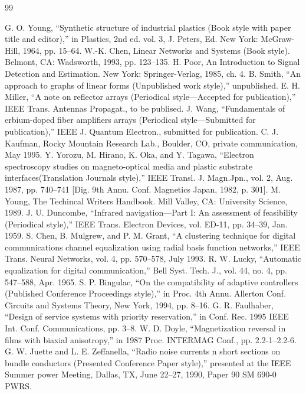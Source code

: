 \documentclass[letterpaper, 10 pt, conference]{ieeeconf}  %
\begin{document}
\begin{thebibliography}{99}

 G. O. Young, ``Synthetic structure of industrial plastics (Book style with paper title and editor),'' 	in Plastics, 2nd ed. vol. 3, J. Peters, Ed.  New York: McGraw-Hill, 1964, pp. 15--64.
 W.-K. Chen, Linear Networks and Systems (Book style).	Belmont, CA: Wadsworth, 1993, pp. 123--135.
 H. Poor, An Introduction to Signal Detection and Estimation.   New York: Springer-Verlag, 1985, ch. 4.
 B. Smith, ``An approach to graphs of linear forms (Unpublished work style),'' unpublished.
 E. H. Miller, ``A note on reflector arrays (Periodical style---Accepted for publication),'' IEEE Trans. Antennas Propagat., to be publised.
 J. Wang, ``Fundamentals of erbium-doped fiber amplifiers arrays (Periodical style---Submitted for publication),'' IEEE J. Quantum Electron., submitted for publication.
 C. J. Kaufman, Rocky Mountain Research Lab., Boulder, CO, private communication, May 1995.
 Y. Yorozu, M. Hirano, K. Oka, and Y. Tagawa, ``Electron spectroscopy studies on magneto-optical media and plastic substrate interfaces(Translation Journals style),'' IEEE Transl. J. Magn.Jpn., vol. 2, Aug. 1987, pp. 740--741 [Dig. 9th Annu. Conf. Magnetics Japan, 1982, p. 301].
 M. Young, The Techincal Writers Handbook.  Mill Valley, CA: University Science, 1989.
 J. U. Duncombe, ``Infrared navigation---Part I: An assessment of feasibility (Periodical style),'' IEEE Trans. Electron Devices, vol. ED-11, pp. 34--39, Jan. 1959.
 S. Chen, B. Mulgrew, and P. M. Grant, ``A clustering technique for digital communications channel equalization using radial basis function networks,'' IEEE Trans. Neural Networks, vol. 4, pp. 570--578, July 1993.
 R. W. Lucky, ``Automatic equalization for digital communication,'' Bell Syst. Tech. J., vol. 44, no. 4, pp. 547--588, Apr. 1965.
 S. P. Bingulac, ``On the compatibility of adaptive controllers (Published Conference Proceedings style),'' in Proc. 4th Annu. Allerton Conf. Circuits and Systems Theory, New York, 1994, pp. 8--16.
 G. R. Faulhaber, ``Design of service systems with priority reservation,'' in Conf. Rec. 1995 IEEE Int. Conf. Communications, pp. 3--8.
 W. D. Doyle, ``Magnetization reversal in films with biaxial anisotropy,'' in 1987 Proc. INTERMAG Conf., pp. 2.2-1--2.2-6.
 G. W. Juette and L. E. Zeffanella, ``Radio noise currents n short sections on bundle conductors (Presented Conference Paper style),'' presented at the IEEE Summer power Meeting, Dallas, TX, June 22--27, 1990, Paper 90 SM 690-0 PWRS.

\end{thebibliography}
\end{document}
